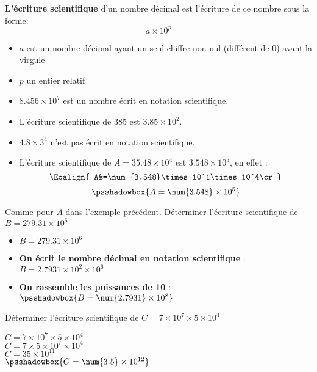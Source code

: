 \begin{definition}
    \textbf{L'écriture scientifique} d'un nombre décimal est l'écriture de ce nombre sous la forme:
    $$a\times10^p$$
    \begin{itemize}
        \item $a$ est un nombre décimal ayant un seul chiffre non nul (différent de 0) avant la virgule
        \item $p$ un entier relatif
    \end{itemize}
\end{definition}

\begin{exemples*1}
    \begin{itemize}
        \item $\num{8.456}\times 10^7$ est un nombre écrit en notation scientifique.
        \item L'écriture scientifique de 385 est $\num{3.85}\times10^2$.
        \item $\num{4.8}\times 3^4$ n'est pas écrit en notation scientifique.
        \item  L'écriture scientifique de $A=\num{35.48}\times10^4$ est $\num{3.548}\times10^5$, en effet :
        $$\Eqalign{
        A&=\num{3.548}\times10^1\times10^4\cr
        }$$
        $$\psshadowbox{A=\num{3.548}\times10^5}$$
    \end{itemize}
    
    \smallskip
\end{exemples*1}

\begin{methode*1}
    Comme pour $A$ dans l'exemple précédent.
    \exercice
    Déterminer l'écriture scientifique de $B = \num{279.31}\times10^6$
    \correction
    \begin{itemize}
        \item $B = \num{279.31}\times10^6$
        \item \textbf{On écrit le nombre décimal en notation scientifique} : $B = \num{2.7931}\times 10^2 \times10^6$
        \item \textbf{On rassemble les puissances de 10} : $\psshadowbox{B = \num{2.7931}\times 10^8}$
    \end{itemize}
\end{methode*1}

\begin{methode*1}
    \exercice
    Déterminer l'écriture scientifique de $C=7\times 10^7 \times 5 \times 10^4$
    \correction

    $C=7\times 10^7 \times 5 \times 10^4$\\
    $C=7 \times 5 \times 10^7 \times 10^4$\\
    $C=35 \times 10^{11}$\\ 
    $\psshadowbox{C=\num{3.5} \times 10^{12}}$ 
\end{methode*1}

